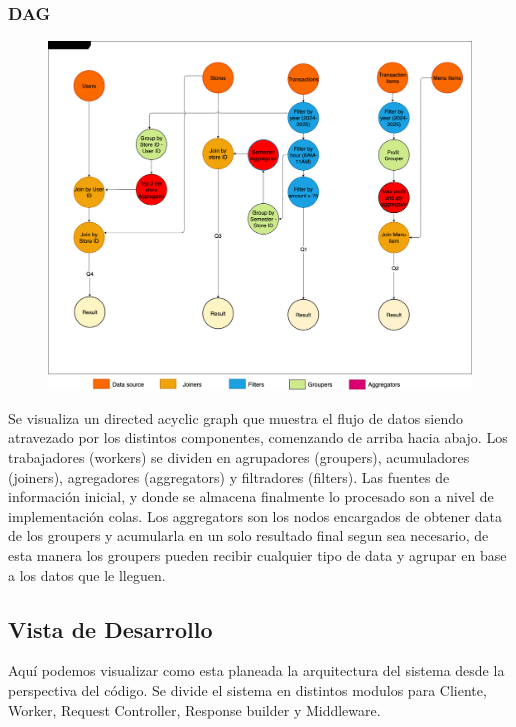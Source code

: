 \documentclass[titlepage,a4paper]{article}
\begin{document}
\subsubsection{DAG}
\begin{figure}[H]
\centering
    \includegraphics[width=1\linewidth]{DAG.png}
\end{figure}
Se visualiza un directed acyclic graph que muestra el flujo de datos siendo atravezado por los distintos componentes, comenzando de arriba hacia abajo. Los trabajadores (workers) se dividen en agrupadores (groupers), acumuladores (joiners), agregadores (aggregators) y filtradores (filters). Las fuentes de información inicial, y donde se almacena finalmente lo procesado son a nivel de implementación colas.
Los aggregators son los nodos encargados de obtener data de los groupers y acumularla en un solo resultado final segun sea necesario, de esta manera los groupers pueden recibir cualquier tipo de data y agrupar en base a los datos que le lleguen.


\subsection{Vista de Desarrollo}
Aquí podemos visualizar como esta planeada la arquitectura del sistema desde la perspectiva del código. Se divide el sistema en distintos modulos para Cliente, Worker, Request Controller, Response builder y Middleware.
\end{document}
